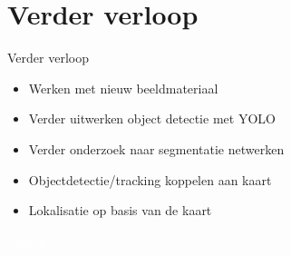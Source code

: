 \documentclass[11pt,t]{beamer}
\begin{document}
 \section{Verder verloop}
 \begin{frame}[fragile]{Verder verloop}
	\begin{itemize}
		\item Werken met nieuw beeldmateriaal
		\item Verder uitwerken object detectie met YOLO
		\item Verder onderzoek naar segmentatie netwerken
		\item Objectdetectie/tracking koppelen aan kaart
		\item Lokalisatie op basis van de kaart
	\end{itemize}
 \end{frame}

\begin{frame}

\centering
\textcolor{white}{Vragen?}
\end{frame}
\end{document}
